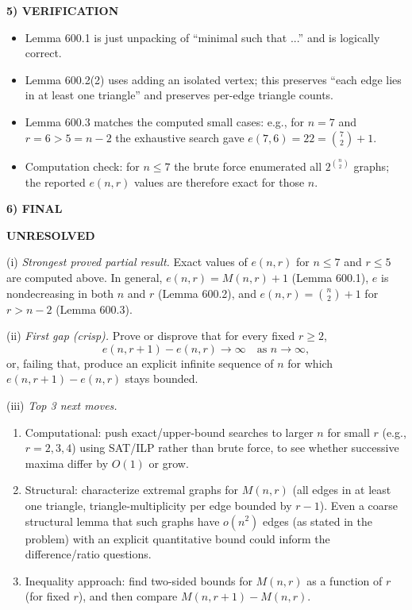 \noindent\textbf{5) VERIFICATION}\par
\begin{itemize}
\item Lemma 600.1 is just unpacking of ``minimal such that ...'' and is logically correct.
\item Lemma 600.2(2) uses adding an isolated vertex; this preserves ``each edge lies in at least one triangle'' and preserves per-edge triangle counts.
\item Lemma 600.3 matches the computed small cases: e.g., for $n=7$ and $r=6>5=n-2$ the exhaustive search gave $e(7,6)=22={7\choose 2}+1$.
\item Computation check: for $n\le 7$ the brute force enumerated all $2^{\binom{n}{2}}$ graphs; the reported $e(n,r)$ values are therefore exact for those $n$.
\end{itemize}

\noindent\textbf{6) FINAL}\par
\textbf{UNRESOLVED}

(i) \emph{Strongest proved partial result.} Exact values of $e(n,r)$ for $n\le 7$ and $r\le 5$ are computed above. In general, $e(n,r)=M(n,r)+1$ (Lemma 600.1), $e$ is nondecreasing in both $n$ and $r$ (Lemma 600.2), and $e(n,r)={n\choose 2}+1$ for $r>n-2$ (Lemma 600.3).

(ii) \emph{First gap (crisp).} Prove or disprove that for every fixed $r\ge 2$,
\[
 e(n,r+1)-e(n,r)\to\infty\quad\text{as } n\to\infty,
\]
or, failing that, produce an explicit infinite sequence of $n$ for which $e(n,r+1)-e(n,r)$ stays bounded.

(iii) \emph{Top 3 next moves.}
\begin{enumerate}
\item Computational: push exact/upper-bound searches to larger $n$ for small $r$ (e.g., $r=2,3,4$) using SAT/ILP rather than brute force, to see whether successive maxima differ by $O(1)$ or grow.
\item Structural: characterize extremal graphs for $M(n,r)$ (all edges in at least one triangle, triangle-multiplicity per edge bounded by $r-1$). Even a coarse structural lemma that such graphs have $o(n^2)$ edges (as stated in the problem) with an explicit quantitative bound could inform the difference/ratio questions.
\item Inequality approach: find two-sided bounds for $M(n,r)$ as a function of $r$ (for fixed $r$), and then compare $M(n,r+1)-M(n,r)$.
\end{enumerate}

